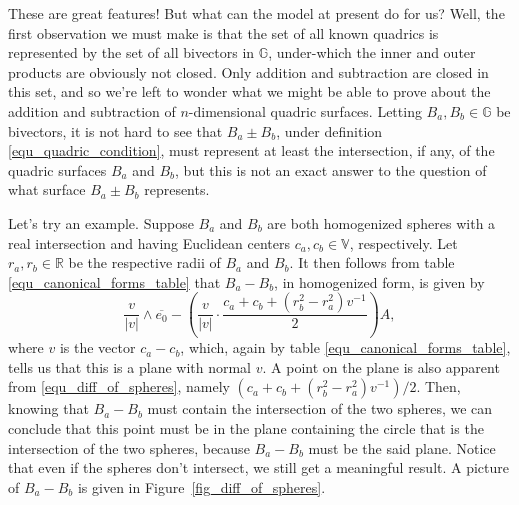 \documentclass{birkjour}
\theoremstyle{definition}
\theoremstyle{remark}
\numberwithin{equation}{section}
\newcommand{\G}{\mathbb{G}}
\newcommand{\V}{\mathbb{V}}
\newcommand{\R}{\mathbb{R}}
\begin{document}
These are great features!  But what can the model at present do for us?  Well,
the first observation we must make is that the set of all known quadrics
is represented by the set of all bivectors in $\G$, under-which the inner
and outer products are obviously not closed.  Only addition and subtraction
are closed in this set, and so we're left to wonder what we might be able
to prove about the addition and subtraction of $n$-dimensional quadric surfaces.
Letting $B_a,B_b\in\G$ be bivectors, it is not hard to see that $B_a\pm B_b$, under
definition \eqref{equ_quadric_condition}, must represent at least the intersection, if any,
of the quadric surfaces $B_a$ and $B_b$, but this is not an exact answer to the
question of what surface $B_a\pm B_b$ represents.

Let's try an example.  Suppose $B_a$ and $B_b$ are both homogenized spheres with
a real intersection and having
Euclidean centers $c_a,c_b\in\V$, respectively.  Let $r_a,r_b\in\R$
be the respective radii of $B_a$ and $B_b$.  It then follows from
table \eqref{equ_canonical_forms_table} that $B_a-B_b$, in homogenized
form, is given by
\begin{equation}\label{equ_diff_of_spheres}
\frac{v}{|v|}\wedge\overline{e_0}-\left(\frac{v}{|v|}\cdot\frac{c_a+c_b+(r_b^2-r_a^2)v^{-1}}{2}\right)A,
\end{equation}
where $v$ is the vector $c_a-c_b$, which, again by table \eqref{equ_canonical_forms_table},
tells us that this is a plane with normal $v$.  A point on the plane is also apparent from
\eqref{equ_diff_of_spheres}, namely $(c_a+c_b+(r_b^2-r_a^2)v^{-1})/2$.
Then, knowing that $B_a-B_b$ must contain the intersection of the
two spheres, we can conclude that this point must be in the plane containing the circle that is
the intersection of the two spheres, because $B_a-B_b$ must be the said plane.  Notice
that even if the spheres don't intersect, we still get a meaningful result.  A picture of
$B_a-B_b$ is given in Figure~\ref{fig_diff_of_spheres}.
\end{document}
